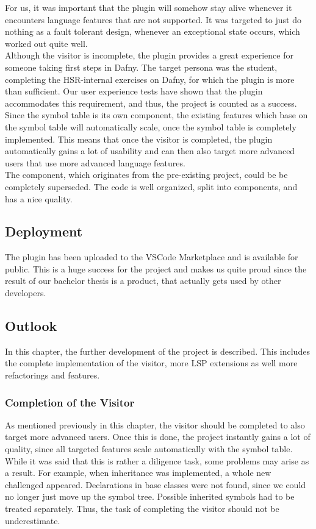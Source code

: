 For us, it was important that the plugin will somehow stay alive whenever it encounters language features that are not supported.
It was targeted to just do nothing as a fault tolerant design, whenever an exceptional state occurs, which worked out quite well.\\

Although the visitor is incomplete, the plugin provides a great experience for someone taking first steps in Dafny.
The target persona was the student, completing the HSR-internal exercises on Dafny, for which the plugin is more than sufficient.
Our user experience tests have shown that the plugin accommodates this requirement, and thus, the project is counted as a success.\\

Since the symbol table is its own component, the existing features which base on the symbol table will automatically scale, once the symbol table is completely implemented.
This means that once the visitor is completed, the plugin automatically gains a lot of usability and can then also target more advanced users that use more advanced language features.\\

The  component, which originates from the pre-existing project, could be be completely superseded.
The code is well organized, split into components, and has a nice quality.

\subsection{Deployment}
The plugin has been uploaded to the VSCode Marketplace and is available for public.
This is a huge success for the project and makes us quite proud since the result of our
bachelor thesis is a product, that actually gets used by other developers.

\subsection{Outlook}
In this chapter, the further development of the project is described.
This includes the complete implementation of the visitor, more LSP extensions as well more refactorings and features.

\subsubsection{Completion of the Visitor}
As mentioned previously in this chapter, the visitor should be completed to also target more advanced users.
Once this is done, the project instantly gains a lot of quality, since all targeted features scale automatically with the symbol table.
While it was said that this is rather a diligence task, some problems may arise as a result.
For example, when inheritance was implemented, a whole new challenged appeared.
Declarations in base classes were not found, since we could no longer just move up the symbol tree.
Possible inherited symbols had to be treated separately.
Thus, the task of completing the visitor should not be underestimate.

